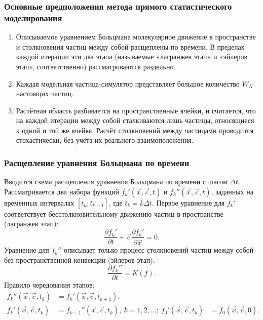 \documentclass[onlymath]{beamer}
\newcommand{\pardiff}[2]{\frac{\partial{#1}}{\partial{#2}}}
\newcommand{\ts}{\Delta t}
\newcommand{\statw}{W_N}
\begin{document}
\begin{frame}
  \frametitle{Основные предположения метода прямого статистического моделирования}
  \begin{enumerate}
\item Описываемое уравнением Больцмана молекулярное движение в
  пространстве и столкновения частиц между собой расщеплены по
  времени. В пределах каждой итерации эти два этапа (называемые
  «лагранжев этап» и «эйлеров этап», соответственно) рассматриваются
  раздельно.
\item Каждая модельная частица-симулятор представляет большое
  количество $\statw$ настоящих частиц.
\item Расчётная область разбивается на пространственные ячейки, и
  считается, что на каждой итерации между собой сталкиваются лишь
  частицы, относящиеся к одной и той же ячейке. Расчёт столкновений
  между частицами проводится стохастически, без учёта их реального
  взаимоположения.
\end{enumerate}
\end{frame}

\begin{frame}
  \frametitle{Расщепление уравнения Больцмана по времени}
  Вводится схема расщепления уравнения Больцмана по времени с шагом
  $\ts$. Рассматривается два набора функций $f_k'(\vec{x},\vec{c},t)$
  и $f_k''(\vec{x},\vec{c},t)$, заданных на временных интервалах
  $[t_k; t_{k+1}]$, где $t_k = k\ts$. Первое уравнение для $f_k'$
  соответствует бесстолкновительному движению частиц в пространстве
  (лагранжев этап):
  \begin{equation*}
    \label{eq:dsmc-splitting1}
    \pardiff{f_k'}{t} + \vec{c}\pardiff{f_k'}{\vec{x}} = 0.
  \end{equation*}
  Уравнение для $f_k''$ описывает только процесс столкновений частиц
  между собой без пространственной конвекции (эйлеров этап):
  \begin{equation*}
    \label{eq:dsmc-splitting2}
    \pardiff{f_k''}{t} = K(f).
  \end{equation*}
Правило чередования этапов:
\begin{equation*}
  \label{eq:dsmc-splitting3}
  \begin{aligned}
    f_k''(\vec{x},\vec{c},t_k) &=
    f_k'(\vec{x},\vec{c},t_{k+1}),\\
    f_k'(\vec{x},\vec{c},t_k) &=
    f_{k-1}''(\vec{x},\vec{c},t_k),\:k=1,2,\dotsc;\:
    f_0'(\vec{x},\vec{c},t_k) &= f_0(\vec{x}, \vec{c}, 0).
  \end{aligned}
\end{equation*}
\end{frame}
\end{document}
